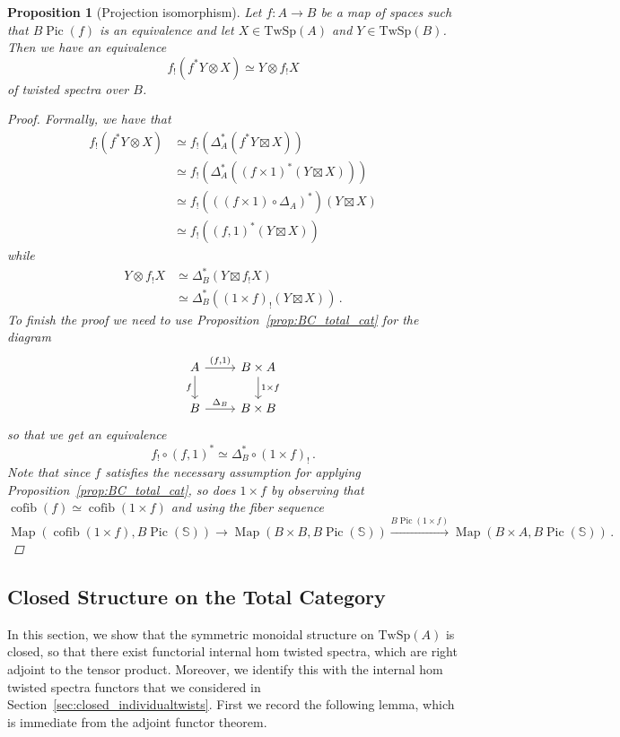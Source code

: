 \documentclass[10pt]{amsart}
\newcommand{\longto}{\longrightarrow}
\theoremstyle{plain}
\newtheorem{proposition}[theorem]{Proposition}
\theoremstyle{definition}
\DeclareMathOperator{\cofib}{cofib}
\DeclareMathOperator{\Pic}{Pic}
\DeclareMathOperator{\Map}{Map}
\newcommand{\bS}{\mathbb{S}}
\newcommand{\TwSp}{\mathrm{TwSp}}
\begin{document}
\begin{proposition}[Projection isomorphism] \label{prop:proj_iso_total}
  Let $f : A \to B$ be a map of spaces such that $B\Pic(f)$ is an equivalence and let $X \in \TwSp(A)$ and $Y \in \TwSp(B)$. Then we have an equivalence
  \[
  f_!(f^* Y \otimes X) \simeq Y \otimes f_! X
  \]
  of twisted spectra over $B$.
  \begin{proof}
    Formally, we have that
    \begin{align*}
      f_! (f^* Y \otimes X) &\simeq f_! (\Delta_A^*(f^* Y \boxtimes X)) \\ &\simeq f_!(\Delta_A^*((f \times 1)^*(Y \boxtimes X))) \\ &\simeq f_! (((f \times 1) \circ \Delta_A)^*)(Y \boxtimes X) \\ &\simeq f_!((f,1)^*(Y \boxtimes X))
    \end{align*}
    while
    \begin{align*}
    Y \otimes f_! X &\simeq \Delta_B^* (Y \boxtimes f_! X) \\ &\simeq \Delta_B^*((1 \times f)_!(Y \boxtimes X)) \,.
    \end{align*}
    To finish the proof we need to use Proposition~\ref{prop:BC_total_cat} for the diagram
    \[
    \begin{tikzcd}
      A \arrow[d,"f"'] \arrow[r,"{(f,1)}"] & B \times A \arrow[d,"1 \times f"] \\
      B \arrow[r,"\Delta_B"] & B \times B
    \end{tikzcd}
    \]
    so that we get an equivalence
    \[
    f_! \circ (f,1)^* \simeq \Delta_B^* \circ (1 \times f)_! \,.
    \]
    Note that since $f$ satisfies the necessary assumption for applying Proposition~\ref{prop:BC_total_cat}, so does $1 \times f$ by observing that $\cofib(f) \simeq \cofib(1 \times f)$ and using the fiber sequence
    \[
    \Map(\cofib(1 \times f),B\Pic(\bS)) \longto \Map(B \times B,B\Pic(\bS)) \overset{B\Pic(1 \times f)}\longto \Map(B \times A , B\Pic(\bS)) \,.
    \]
  \end{proof}
\end{proposition}

\subsection{Closed Structure on the Total Category}

In this section, we show that the symmetric monoidal structure on $\TwSp(A)$ is closed, so that there exist functorial internal hom twisted spectra, which are right adjoint to the tensor product.
Moreover, we identify this with the internal hom twisted spectra functors that we considered in Section~\ref{sec:closed_individualtwists}.
First we record the following lemma, which is immediate from the adjoint functor theorem.
\end{document}
